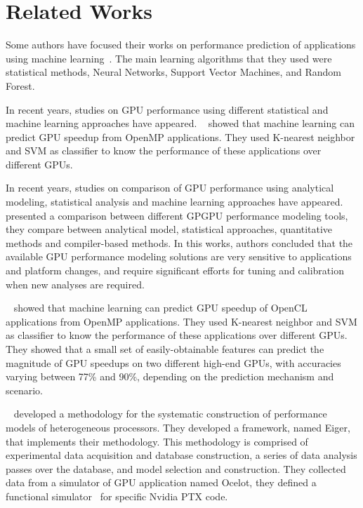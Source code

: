 \section{Related Works}\label{sec:relatedWorksML}
Some authors have focused their works on performance prediction of applications using machine learning~\citep{Jiangtian:2009, Ozisikyilmaz:2008, Singh:2007:PPA, Ipek:2005:APP,Matsunaga:2010}. The main learning algorithms that they used were statistical methods, Neural Networks, Support Vector Machines, and Random Forest.

In  recent  years,  studies on GPU performance using different statistical and machine learning approaches have appeared. ~\cite{Baldini:2014} showed that machine learning can predict GPU speedup from OpenMP applications. They used K-nearest neighbor and SVM as classifier to know the performance of these applications over different GPUs. 

In  recent  years, studies on comparison of GPU performance using analytical modeling, statistical analysis and machine learning approaches have appeared. ~\cite{Madougou:2016} presented a comparison between different GPGPU performance modeling tools, they compare between analytical model, statistical approaches, quantitative methods and compiler-based methods. In this works, authors concluded that the available GPU performance modeling solutions are very sensitive to applications and platform changes, and require
significant efforts for tuning and calibration when new analyses are required.

~\cite{Baldini:2014} showed that machine learning can predict GPU speedup of OpenCL applications from OpenMP applications. They used K-nearest neighbor and SVM as classifier to know the performance of these applications over different GPUs. They showed that a small set of easily-obtainable features can predict the magnitude of GPU speedups on two different high-end GPUs, with accuracies varying between 77\% and 90\%, depending on the prediction mechanism and scenario.

~\cite{Kerr:2012:Eiger} developed a methodology for the systematic construction of performance models of heterogeneous processors. They developed a framework, named Eiger, that implements their methodology. This methodology is comprised of experimental data acquisition and database construction, a series of data analysis passes over the database, and model selection and construction. They collected data from a simulator of GPU application named Ocelot, they defined a functional simulator~\cite{kerr2009characterization} for specific Nvidia PTX code. 

